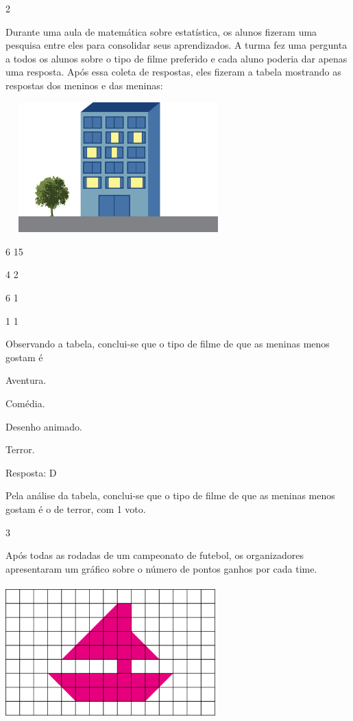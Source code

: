 {\begin{escolha}
{\num{2}

Durante uma aula de matemática sobre estatística, os alunos fizeram uma
pesquisa entre eles para consolidar seus aprendizados. A turma fez uma
pergunta a todos os alunos sobre o tipo de filme preferido e cada aluno
poderia dar apenas uma resposta. Após essa coleta de respostas, eles
fizeram a tabela mostrando as respostas dos meninos e das
meninas:

\includegraphics[width=3.42308in,height=1.97646in]{media/image93.png}


6 15

4 2

6 1

1 1

Observando a tabela, conclui-se que o tipo de filme de que as meninas menos
gostam é

\begin{escolha}

\item
  Aventura.
\item
  Comédia.
\item
  Desenho animado.
\item
  Terror.
\end{escolha}

Resposta: D

Pela análise da tabela, conclui-se que o tipo de filme de que as meninas menos gostam é o de terror, com 1 voto.

\num{3}

Após todas as rodadas de um campeonato de futebol, os organizadores
apresentaram um gráfico sobre o número de pontos ganhos por cada
time.

\includegraphics[width=3.19194in,height=2.04184in]{media/image94.png}

}
\end{escolha}}
